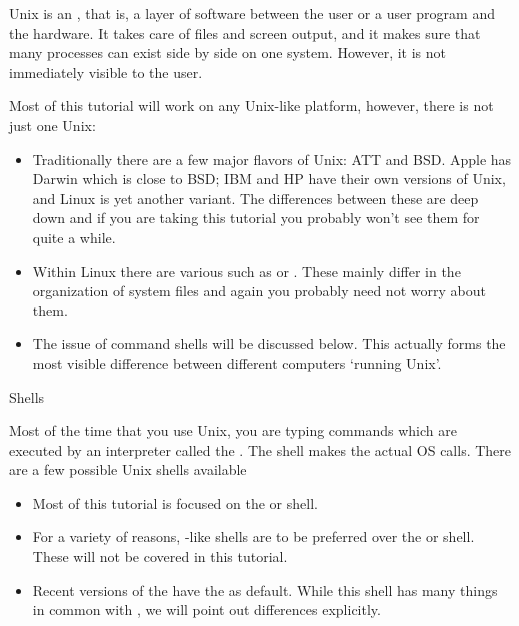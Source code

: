 
Unix is an , that is, a layer of software
between the user or a user program and the hardware. It takes care of
files and screen output, and it makes sure that many processes can exist
side by side on one system. However, it is not immediately visible to
the user.

Most of this tutorial will work on any Unix-like platform,
however, there is not just one Unix:
\begin{itemize}
\item Traditionally there are a few major flavors of Unix: ATT and BSD.
  Apple has Darwin which is close to BSD; IBM and HP have their own
  versions of Unix, and Linux is yet another variant. The differences between
  these are deep down and if you are taking this tutorial you probably
  won't see them for quite a while.
\item Within Linux there are various 
  such as  or . These mainly differ
  in the organization of system files and again you probably need not worry
  about them.
\item The issue of command shells will be discussed below.
  This actually forms the most visible difference between different
  computers `running Unix'.
\end{itemize}


 {Shells}

Most of the time that you use Unix, you are typing commands which are
executed by an interpreter called the . The shell
makes the actual \ac{OS} calls. There are a few possible Unix shells
available
\begin{itemize}
\item Most of this tutorial is focused on the
   or  shell.
\item For a variety of reasons, -like shells are to be preferred over the
   or  shell. These will not be covered
  in this tutorial.
\item Recent versions of the 
  have the  as default.
  While this shell has many things in common with ,
  we will point out differences explicitly.
\end{itemize}

